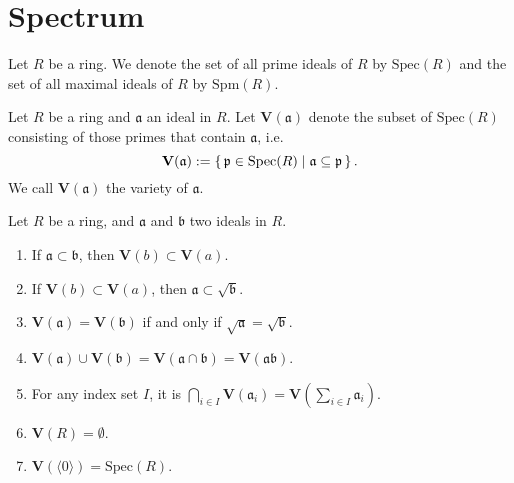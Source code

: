 \chapter{Spectrum}

\begin{defn}[Spectrum]
    Let \(R\) be a ring. We denote the set of all prime ideals of \(R\) by \(\mathrm{Spec}(R)\) and the set of all maximal ideals of \(R\) by \(\mathrm{Spm}(R)\).
\end{defn}

\begin{defn}[Variety]
    Let \(R\) be a ring and \(\mathfrak{a}\) an ideal in \(R\). Let \(\mathbf{V}(\mathfrak{a})\) denote the subset of \(\mathrm{Spec}(R)\) consisting of those primes that contain \(\mathfrak{a}\), i.e.
    \begin{equation}
        \mathbf{V}(\mathfrak{a}) := \left\{\, \mathfrak{p} \in \mathrm{Spec}(R) \mathrel{\mid} \mathfrak{a} \subseteq \mathfrak{p} \,\right\}\text{.}
    \end{equation}
    We call \(\mathbf{V}(\mathfrak{a})\) the variety of \(\mathfrak{a}\).
\end{defn}

\begin{prps}
    Let \(R\) be a ring, and \(\mathfrak{a}\) and \(\mathfrak{b}\) two ideals in \(R\).
    \begin{enumerate}
        \item If \(\mathfrak{a} \subset \mathfrak{b}\), then \(\mathbf{V}(b) \subset \mathbf{V}(a)\).
        \item If \(\mathbf{V}(b) \subset \mathbf{V}(a)\), then \(\mathfrak{a} \subset \sqrt{\mathfrak{b}}\).
        \item \(\mathbf{V}(\mathfrak{a}) = \mathbf{V}(\mathfrak{b})\) if and only if \(\sqrt{\mathfrak{a}} = \sqrt{\mathfrak{b}}\).
        \item \(\mathbf{V}(\mathfrak{a}) \cup \mathbf{V}(\mathfrak{b}) = \mathbf{V}(\mathfrak{a} \cap \mathfrak{b}) = \mathbf{V}(\mathfrak{a}\mathfrak{b})\).
        \item For any index set \(I\), it is \(\bigcap_{i \in I}\mathbf{V}(\mathfrak{a}_i) = \mathbf{V}(\sum_{i \in I}\mathfrak{a}_i)\).
        \item \(\mathbf{V}(R) = \emptyset\).
        \item \(\mathbf{V}(\langle 0 \rangle) = \mathrm{Spec}(R)\).
    \end{enumerate}
\end{prps}

